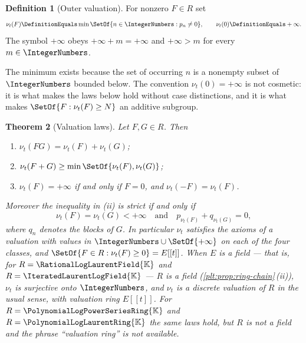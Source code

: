 \documentclass[11pt,oneside]{article}
\theoremstyle{plain}
\newtheorem{theorem}{Theorem}[section]
\theoremstyle{definition}
\newtheorem{definition}[theorem]{Definition}
\theoremstyle{remark}
\newcommand{\K}{\mathbb{K}}
\newcommand{\PLpow}{\PolynomialLogPowerSeriesRing{\K}}   %
\newcommand{\PLlau}{\PolynomialLogLaurentRing{\K}}       %
\newcommand{\PLrat}{\RationalLogLaurentField{\K}}        %
\newcommand{\PLit}{\IteratedLaurentLogField{\K}}         %
\newcommand{\ordt}{\nu_{t}}                              %
\begin{document}
\begin{definition}[Outer valuation]
\label{plt:def:lead-ordt}
For nonzero \(F\in R\) set
\begin{equation}\label{plt:eq:lead-ordt}
  \ordt(F)\DefinitionEquals\min\SetOf{n\in\IntegerNumbers:p_n\ne0},
  \qquad
  \ordt(0)\DefinitionEquals+\infty .
\end{equation}
The symbol \(+\infty\) obeys \(+\infty+m=+\infty\) and
\(+\infty>m\) for every \(m\in\IntegerNumbers\).
\end{definition}

The minimum exists because the set of occurring \(n\) is a nonempty subset of
\(\IntegerNumbers\) bounded below.  The convention \(\ordt(0)=+\infty\) is not
cosmetic: it is what makes the laws below hold without case distinctions, and
it is what makes \(\SetOf{F:\ordt(F)\ge N}\) an additive subgroup.

\begin{theorem}[Valuation laws]
\label{plt:thm:ring-valuation-laws}
Let \(F,G\in R\).  Then
\begin{enumerate}[label=\textup{(\roman*)}]
\item \(\ordt(FG)=\ordt(F)+\ordt(G)\);
\item \(\ordt(F+G)\ge\min\SetOf{\ordt(F),\ordt(G)}\);
\item \(\ordt(F)=+\infty\) if and only if \(F=0\), and
  \(\ordt(-F)=\ordt(F)\).
\end{enumerate}
Moreover the inequality in \textup{(ii)} is \emph{strict} if and only if
\begin{equation}\label{plt:eq:lead-strict-condition}
  \ordt(F)=\ordt(G)<+\infty
  \quad\text{and}\quad
  p_{\ordt(F)}+q_{\ordt(G)}=0,
\end{equation}
where \(q_n\) denotes the blocks of \(G\).  In particular \(\ordt\) satisfies
the axioms of a valuation with values in
\(\IntegerNumbers\cup\SetOf{+\infty}\) on each of the four classes, and
\(\SetOf{F\in R:\ordt(F)\ge0}=E[[t]]\).  When \(E\) is a field --- that is,
for \(R=\PLrat\) and \(R=\PLit\) --- \(R\) is a field
(\cref{plt:prop:ring-chain}\,(ii)), \(\ordt\) is surjective
onto \(\IntegerNumbers\), and \(\ordt\) is a discrete valuation of \(R\) in
the usual sense, with valuation ring \(E[[t]]\).  For \(R=\PLpow\) and
\(R=\PLlau\) the same laws hold, but \(R\) is not a field and the phrase
``valuation ring'' is not available.
\end{theorem}
\end{document}
